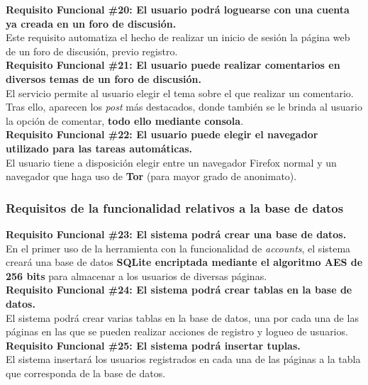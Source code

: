 \begin{adjustwidth}{0.5cm}{}
	\linebreak	
	\textbf{Requisito Funcional \#20: El usuario podrá loguearse con una cuenta ya creada en un foro de discusión.}\\
	Este requisito automatiza el hecho de realizar un inicio de sesión la página web de un foro de discusión, previo registro. \\
	\linebreak	
	\textbf{Requisito Funcional \#21: El usuario puede realizar comentarios en diversos temas de un foro de discusión.}\\
	El servicio permite al usuario elegir el tema sobre el que realizar un comentario. Tras ello, aparecen los \textit{post} más destacados, donde también se le brinda al usuario la opción de comentar, \textbf{todo ello mediante consola}.\\			
	\linebreak		
	\textbf{Requisito Funcional \#22: El usuario puede elegir el navegador utilizado para las tareas automáticas.}\\
	El usuario tiene a disposición elegir entre un navegador Firefox normal y un navegador que haga uso de \textbf{Tor} (para mayor grado de anonimato).\\				
\end{adjustwidth}
\subsubsection{Requisitos de la funcionalidad relativos a la base de datos}
\begin{adjustwidth}{0.5cm}{}
	\textbf{Requisito Funcional \#23: El sistema podrá crear una base de datos.}\\
	En el primer uso de la herramienta con la funcionalidad de \textit{accounts}, el sistema creará una base de datos \textbf{SQLite encriptada mediante el algoritmo AES de 256 bits} para almacenar a los usuarios de diversas páginas. \\
	\linebreak		
	\textbf{Requisito Funcional \#24: El sistema podrá crear tablas en la base de datos.}\\
	El sistema podrá crear varias tablas en la base de datos, una por cada una de las páginas en las que se pueden realizar acciones de registro y logueo de usuarios. \\
	\linebreak		
	\textbf{Requisito Funcional \#25: El sistema podrá insertar tuplas.}\\
	El sistema insertará los usuarios registrados en cada una de las páginas a la tabla que corresponda de la base de datos. \\	
	\linebreak			
\end{adjustwidth}
